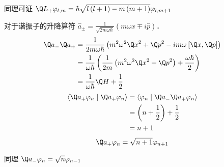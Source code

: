同理可证 ${\Q L_ + }{\varphi_{l,m}} = \hbar \sqrt {l\left( {l + 1} \right) - m\left( {m + 1} \right)} {\varphi_{l,m + 1}}$ 


对于谐振子的升降算符 ${\hat a_ \pm } = \frac{1}{{\sqrt {2m\omega \hbar } }}\left( {m\omega \hat x \mp i\hat p} \right)$．   
 \begin{equation}
  \begin{aligned}
  {{\Q a}_ - }{{\Q a}_ + } &= \frac{1}{{2m\omega \hbar }}\left( {{m^2}{\omega ^2}{{\Q x}^2} + {{\Q p}^2} - im\omega {\kern 1pt} {\kern 1pt} [\Q x,\Q p]} \right) \hfill \\
   &= \frac{1}{{\omega \hbar }}\left( {\frac{1}{{2m}}\left( {{m^2}{\omega ^2}{{\Q x}^2} + {{\Q p}^2}} \right) + \frac{{\omega \hbar }}{2}} \right) \hfill \\
  & = \frac{1}{{\omega \hbar }}\Q H + \frac{1}{2} \hfill \\ 
\end{aligned} 
\end{equation}
 \begin{equation}
  \begin{aligned}
  \left\langle {{{{\Q a}_ + }{\varphi_n}}}
 \mathrel{\left | {\vphantom {{{{\Q a}_ + }{\varphi_n}} {{{\Q a}_ + }{\varphi_n}}}}
 \right. \kern-\nulldelimiterspace}
 {{{{\Q a}_ + }{\varphi_n}}} \right\rangle  &= \left\langle {{{\varphi_n}}}
 \mathrel{\left | {\vphantom {{{\varphi_n}} {{{\Q a}_ - }{{\Q a}_ + }{\varphi_n}}}}
 \right. \kern-\nulldelimiterspace}
 {{{{\Q a}_ - }{{\Q a}_ + }{\varphi_n}}} \right\rangle  \hfill \\
  & = \left( {n + \frac{1}{2}} \right) + \frac{1}{2} \\
  &= n + 1 \hfill \\ 
\end{aligned} 
\end{equation}
\begin{equation}
  {\Q a_ + }{\varphi_n} = \sqrt {n + 1} {\varphi_{n + 1}}
\end{equation}
 
同理 ${\Q a_ - }{\varphi_n} = \sqrt n {\varphi_{n - 1}}$   

